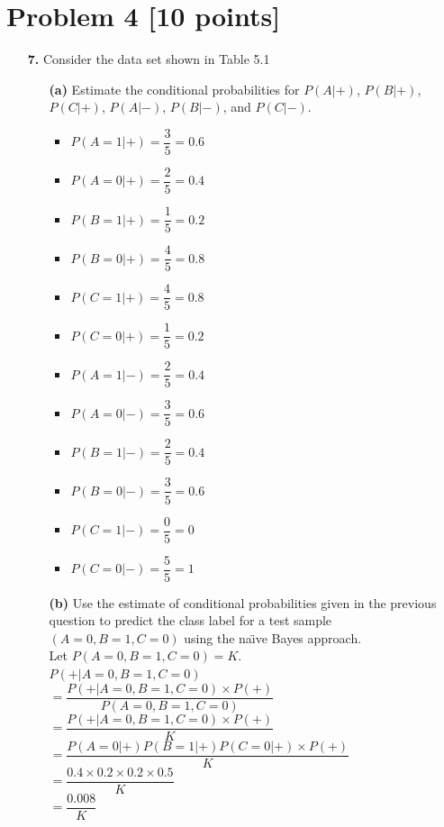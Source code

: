 \documentclass{article}
\begin{document}
\section*{Problem 4 [10 points]} 
\begin{itemize}
	\item [\textbf{7.}]Consider the data set shown in Table 5.1
	\begin{itemize}
		\item [\textbf{(a)}]Estimate the conditional probabilities for $P(A|+)$, $P(B|+)$, $P(C|+)$,
		$P(A|-)$, $P(B|-)$, and $P(C|-)$.
		\begin{itemize}
			\item  $P(A = 1|+) = \dfrac{3}{5} = 0.6$
			\item  $P(A = 0|+) = \dfrac{2}{5} = 0.4$
			\item  $P(B = 1|+) = \dfrac{1}{5} = 0.2$
			\item  $P(B = 0|+) = \dfrac{4}{5} = 0.8$
			\item  $P(C = 1|+) = \dfrac{4}{5} = 0.8$
			\item  $P(C = 0|+) = \dfrac{1}{5} = 0.2$
			\item  $P(A = 1|-) = \dfrac{2}{5} = 0.4$
			\item  $P(A = 0|-) = \dfrac{3}{5} = 0.6$
			\item  $P(B = 1|-) = \dfrac{2}{5} = 0.4$
			\item  $P(B = 0|-) = \dfrac{3}{5} = 0.6$
			\item  $P(C = 1|-) = \dfrac{0}{5} = 0$
			\item  $P(C = 0|-) = \dfrac{5}{5} = 1$
		\end{itemize}
		\item [\textbf{(b)}]Use the estimate of conditional probabilities given in the previous question
		to predict the class label for a test sample $(A = 0,B = 1, C = 0)$ using the na\"{\i}ve Bayes approach.\\
		Let $ P(A = 0,B = 1, C = 0) = K $.\\
		$  P(+|A = 0,B = 1, C = 0) $\\
		$= \dfrac{ P(+|A = 0,B = 1, C = 0)\times P(+)}{ P(A = 0,B = 1, C = 0)}$\\
		$=\dfrac{P(+|A = 0,B = 1, C = 0)\times P(+)}{K}$\\
		$=\dfrac{P(A = 0|+)P(B = 1|+)P(C = 0|+) \times P(+)}{K}$\\
		$=\dfrac{0.4 \times 0.2 \times 0.2 \times 0.5}{K}$\\
		$=\dfrac{0.008}{K}$\\

\end{itemize}
\end{itemize}
\end{document}
